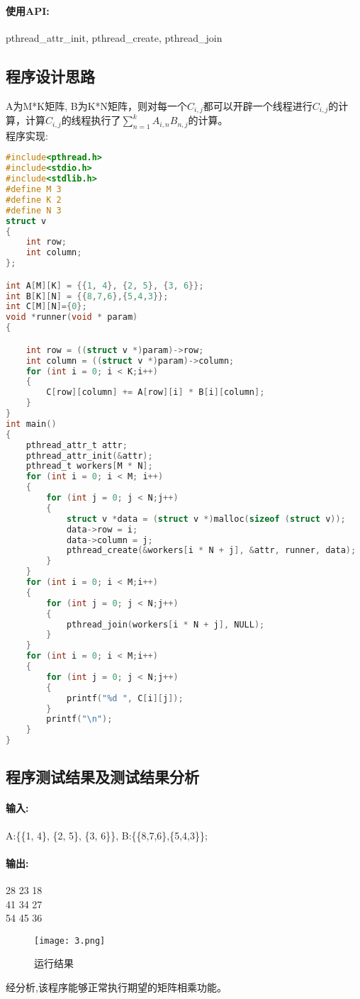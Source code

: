 \documentclass[UTF8]{ctexart}
\begin{document}
\paragraph{使用API:}pthread\_attr\_init, pthread\_create, pthread\_join
\subsection{程序设计思路}
A为M*K矩阵, B为K*N矩阵，则对每一个\(C_{i,j}\)都可以开辟一个线程进行\(C_{i,j}\)的计算，计算\(C_{i,j}\)的线程执行了\(\sum_{n=1}^{k}A_{i,n}B_{n,j}\)的计算。\\
程序实现:
\begin{lstlisting}[language=C]
#include<pthread.h>
#include<stdio.h>
#include<stdlib.h>
#define M 3
#define K 2
#define N 3
struct v
{
    int row;
    int column;
};

int A[M][K] = {{1, 4}, {2, 5}, {3, 6}};
int B[K][N] = {{8,7,6},{5,4,3}};
int C[M][N]={0};
void *runner(void * param)
{

    int row = ((struct v *)param)->row;
    int column = ((struct v *)param)->column;
    for (int i = 0; i < K;i++)
    {
        C[row][column] += A[row][i] * B[i][column];
    }
}
int main()
{
    pthread_attr_t attr;
    pthread_attr_init(&attr);
    pthread_t workers[M * N];
    for (int i = 0; i < M; i++)
    {
        for (int j = 0; j < N;j++)
        {
            struct v *data = (struct v *)malloc(sizeof (struct v));
            data->row = i;
            data->column = j;
            pthread_create(&workers[i * N + j], &attr, runner, data);
        }
    }
    for (int i = 0; i < M;i++)
    {
        for (int j = 0; j < N;j++)
        {
            pthread_join(workers[i * N + j], NULL);
        }
    }
    for (int i = 0; i < M;i++)
    {
        for (int j = 0; j < N;j++)
        {
            printf("%d ", C[i][j]);
        }
        printf("\n");
    }
}
\end{lstlisting}
\subsection{程序测试结果及测试结果分析}
\paragraph{输入:}A:\{\{1, 4\}, \{2, 5\}, \{3, 6\}\}, B:\{\{8,7,6\},\{5,4,3\}\};
\paragraph{输出:} 
 
28 23 18 \\
41 34 27 \\
54 45 36\\
\begin{figure}[htbp]
    \centering
    \texttt{[image: 3.png]}
    \caption{运行结果}
\end{figure} 
经分析,该程序能够正常执行期望的矩阵相乘功能。
\end{document}
